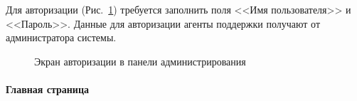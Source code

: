 \documentclass{../includes/TechDoc}
\begin{document}
    Для авторизации (Рис.~\ref{ris:admin_login}) требуется заполнить поля <<Имя пользователя>> и <<Пароль>>.
    Данные для авторизации агенты поддержки получают от администратора системы.
    \begin{figure}[ht]
        \centering
        \caption{Экран авторизации в панели администрирования}
        \label{ris:admin_login}
    \end{figure}

    \clearpage

    \paragraph{Главная страница}
\end{document}
